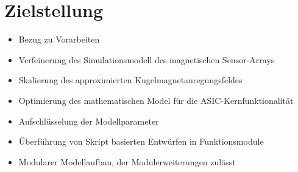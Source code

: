 %

\section{Zielstellung}\label{sec:zielstellung}
\begin{itemize}
	\item Bezug zu Vorarbeiten
	\item Verfeinerung des Simulationsmodell des magnetischen Sensor-Arrays
	\item Skalierung des approximierten Kugelmagnetanregungsfeldes
	\item Optimierung des mathematischen Model für die ASIC-Kernfunktionalität
	\item Aufschlüsselung der Modellparameter
	\item Überführung von Skript basierten Entwürfen in Funktionsmodule
	\item Modularer Modellaufbau, der Modulerweiterungen zulässt
\end{itemize}
